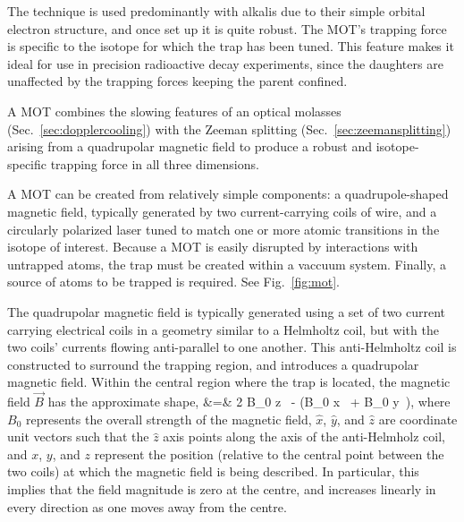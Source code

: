 The technique is used predominantly with alkalis due to their simple orbital electron structure, and once set up it is quite robust.  The MOT's trapping force is specific to the isotope for which the trap has been tuned. This feature makes it ideal for use in precision radioactive decay experiments, since the daughters are unaffected by the trapping forces keeping the parent confined.

A \ac{MOT} combines the slowing features of an optical molasses (Sec.~\ref{sec:dopplercooling}) with the Zeeman splitting (Sec.~\ref{sec:zeemansplitting}) arising from a quadrupolar magnetic field to produce a robust and isotope-specific trapping force in all three dimensions.  

A MOT can be created from relatively simple components:  a quadrupole-shaped magnetic field, typically generated by two current-carrying coils of wire, and a circularly polarized laser tuned to match one or more atomic transitions in the isotope of interest.  Because a MOT is easily disrupted by interactions with untrapped atoms, the trap must be created within a vaccuum system.  Finally, a source of atoms to be trapped is required.  See Fig.~\ref{fig:mot}.



The quadrupolar magnetic field is typically generated using a set of two current carrying electrical coils in a geometry similar to a Helmholtz coil, but with the two coils' currents flowing anti-parallel to one another.  This anti-Helmholtz coil is constructed to surround the trapping region, and introduces a quadrupolar magnetic field.  Within the central region where the trap is located, the magnetic field $\vec{B}$ has the approximate shape,
\bea
	 &=& 2 B_0 z \, - (B_0 x \, + B_0 y \,), 
\eea
where $B_0$ represents the overall strength of the magnetic field, $\hat{x}$, $\hat{y}$, and $\hat{z}$ are coordinate unit vectors such that the $\hat{z}$ axis points along the axis of the anti-Helmholz coil, and $x$, $y$, and $z$ represent the position (relative to the central point between the two coils) at which the magnetic field is being described.
In particular, this implies that the field magnitude is zero at the centre, and increases linearly in every direction as one moves away from the centre.

